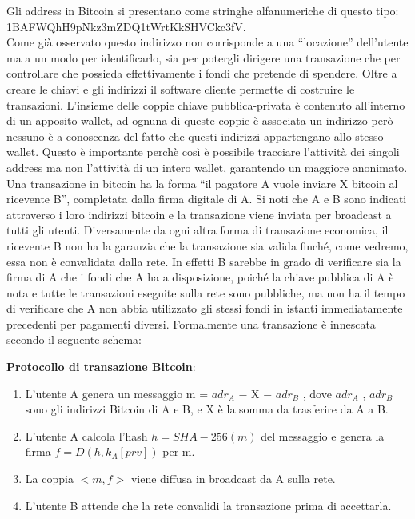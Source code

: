 \FloatBarrier
Gli address in Bitcoin si presentano come stringhe alfanumeriche di questo tipo: 1BAFWQhH9pNkz3mZDQ1tWrtKkSHVCkc3fV.\\Come già osservato questo indirizzo non corrisponde a una “locazione” dell'utente ma a un modo per identiﬁcarlo, sia per potergli dirigere una transazione che per controllare che possieda eﬀettivamente i fondi che pretende di spendere. Oltre a creare le chiavi e gli indirizzi il software cliente permette di costruire le transazioni. L'insieme delle coppie chiave pubblica-privata è contenuto all'interno di un apposito wallet, ad ognuna di queste coppie è associata un indirizzo però nessuno è a conoscenza del fatto che questi indirizzi appartengano allo stesso wallet. Questo è importante perchè così è possibile tracciare l'attività dei singoli address ma non l'attività di un intero wallet, garantendo un maggiore anonimato. Una transazione in bitcoin ha la forma “il pagatore A vuole inviare X bitcoin al ricevente B”, completata dalla ﬁrma digitale di A. Si noti che A e B sono indicati attraverso i loro indirizzi bitcoin e la transazione viene inviata per broadcast a tutti gli utenti. Diversamente da ogni altra forma di transazione economica, il ricevente B non ha la garanzia che la transazione sia valida ﬁnché, come vedremo, essa non è convalidata dalla rete. In eﬀetti B sarebbe in grado di veriﬁcare sia la ﬁrma di A che i fondi che A ha a disposizione, poiché la chiave pubblica di A è nota e tutte le transazioni eseguite sulla rete sono pubbliche, ma non ha il tempo di veriﬁcare che A non abbia utilizzato gli stessi fondi in istanti immediatamente precedenti per pagamenti diversi. Formalmente una transazione è innescata secondo il seguente schema:
\begin{center}
\textbf{Protocollo di transazione Bitcoin}:
\begin{enumerate}
    \item L’utente A genera un messaggio m = $adr_A$ $-$ X $-$ $adr_B$ , dove $adr_A$ , $adr_B$ sono gli indirizzi Bitcoin di A e B, e X è la somma da trasferire da A a B.
    \item L’utente A calcola l’hash $h = SHA-256(m)$ del messaggio e genera la ﬁrma $f = D(h, k_A [prv])$ per m.
    \item La coppia $<m, f>$ viene diffusa in broadcast da A sulla rete.
    \item L’utente B attende che la rete convalidi la transazione prima di accettarla.
\end{enumerate}
\end{center}
